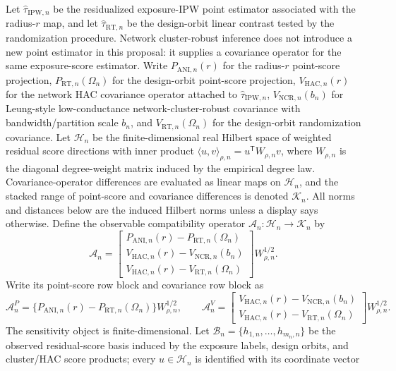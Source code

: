 \documentclass[11pt]{article}
\newcommand{\transpose}{\mathsf{T}}
\theoremstyle{definition}
\theoremstyle{plain}
\theoremstyle{remark}
\begin{document}
Let \(\hat\tau_{\mathrm{IPW},n}\) be the residualized exposure-IPW point
estimator associated with the radius-\(r\) map, and let
\(\hat\tau_{\mathrm{RT},n}\) be the design-orbit linear contrast tested by the
randomization procedure.  Network cluster-robust inference does not introduce a
new point estimator in this proposal: it supplies a covariance operator for the
same exposure-score estimator.  Write \(P_{\mathrm{ANI},n}(r)\) for the
radius-\(r\) point-score projection, \(P_{\mathrm{RT},n}(\Omega_n)\) for the
design-orbit point-score projection, \(V_{\mathrm{HAC},n}(r)\) for the network
HAC covariance operator attached to \(\hat\tau_{\mathrm{IPW},n}\),
\(V_{\mathrm{NCR},n}(b_n)\) for Leung-style low-conductance
network-cluster-robust covariance with bandwidth/partition scale \(b_n\), and
\(V_{\mathrm{RT},n}(\Omega_n)\) for the design-orbit randomization covariance.
Let \(\mathcal H_n\) be the finite-dimensional real Hilbert space of weighted
residual score directions with inner product
\(\langle u,v\rangle_{\rho,n}=u^{\transpose}W_{\rho,n}v\), where
\(W_{\rho,n}\) is the diagonal degree-weight matrix induced by the empirical
degree law.  Covariance-operator differences are evaluated as linear maps on
\(\mathcal H_n\), and the stacked range of point-score and covariance
differences is denoted \(\mathcal K_n\).  All norms and distances below are
the induced Hilbert norms unless a display says otherwise.  Define the
observable compatibility operator \(\mathcal A_n:\mathcal H_n\to\mathcal K_n\)
by
\[
  \mathcal A_n =
  \begin{bmatrix}
  P_{\mathrm{ANI},n}(r)-P_{\mathrm{RT},n}(\Omega_n)\\
  V_{\mathrm{HAC},n}(r)-V_{\mathrm{NCR},n}(b_n)\\
  V_{\mathrm{HAC},n}(r)-V_{\mathrm{RT},n}(\Omega_n)
  \end{bmatrix} W_{\rho,n}^{1/2}.
\]
Write its point-score row block and covariance row block as
\[
  \mathcal A^P_n
  =
  \{P_{\mathrm{ANI},n}(r)-P_{\mathrm{RT},n}(\Omega_n)\}W_{\rho,n}^{1/2},
  \qquad
  \mathcal A^V_n
  =
  \begin{bmatrix}
  V_{\mathrm{HAC},n}(r)-V_{\mathrm{NCR},n}(b_n)\\
  V_{\mathrm{HAC},n}(r)-V_{\mathrm{RT},n}(\Omega_n)
  \end{bmatrix} W_{\rho,n}^{1/2}.
\]
The sensitivity object is finite-dimensional.  Let
\(\mathcal B_n=\{h_{1,n},\ldots,h_{m_n,n}\}\) be the observed residual-score
basis induced by the exposure labels, design orbits, and cluster/HAC score
products; every \(u\in\mathcal H_n\) is identified with its coordinate vector
\end{document}
